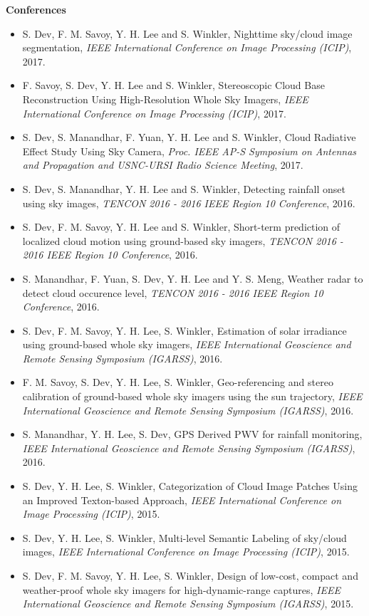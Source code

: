 \noindent 
\textbf{Conferences}
\begin{itemize}[leftmargin=*]
\item S. Dev, F. M. Savoy, Y. H. Lee and S. Winkler, Nighttime sky/cloud image segmentation, \emph{IEEE International Conference on Image Processing (ICIP)}, 2017.
\item F. Savoy, S. Dev, Y. H. Lee and S. Winkler, Stereoscopic Cloud Base Reconstruction Using High-Resolution Whole Sky Imagers, \emph{IEEE International Conference on Image Processing (ICIP)}, 2017. 
\item S. Dev, S. Manandhar, F. Yuan, Y. H. Lee and S. Winkler, Cloud Radiative Effect Study Using Sky Camera, \emph{Proc. IEEE AP-S Symposium on Antennas and Propagation and USNC-URSI Radio Science Meeting}, 2017.
\item  S. Dev, S. Manandhar, Y. H. Lee and S. Winkler,  Detecting rainfall onset using sky images, \emph{TENCON 2016 - 2016 IEEE Region 10 Conference}, 2016.
\item  S. Dev, F. M. Savoy, Y. H. Lee and S. Winkler, Short-term prediction of localized cloud motion using ground-based sky imagers, \emph{TENCON 2016 - 2016 IEEE Region 10 Conference}, 2016.
\item  S. Manandhar, F. Yuan, S. Dev, Y. H. Lee and Y. S. Meng, Weather radar to detect cloud occurence level, \emph{TENCON 2016 - 2016 IEEE Region 10 Conference}, 2016.
\item  S. Dev, F. M. Savoy, Y. H. Lee, S. Winkler, Estimation of solar irradiance using ground-based whole sky imagers, \emph{IEEE International Geoscience and Remote Sensing Symposium (IGARSS)}, 2016.
\item F. M. Savoy, S. Dev, Y. H. Lee, S. Winkler, Geo-referencing and stereo calibration of ground-based whole sky imagers using the sun trajectory, \emph{IEEE International Geoscience and Remote Sensing Symposium (IGARSS)}, 2016.
\item S. Manandhar, Y. H. Lee, S. Dev, GPS Derived PWV for rainfall monitoring, \emph{IEEE International Geoscience and Remote Sensing Symposium (IGARSS)}, 2016.
\item S. Dev, Y. H. Lee, S. Winkler, Categorization of Cloud Image Patches Using an Improved Texton-based Approach, \emph{IEEE International Conference on Image Processing (ICIP)}, 2015. 
\item S. Dev, Y. H. Lee, S. Winkler, Multi-level Semantic Labeling of sky/cloud images, \emph{IEEE International Conference on Image Processing (ICIP)}, 2015. 
\item S. Dev, F. M. Savoy, Y. H. Lee, S. Winkler, Design of low-cost, compact and weather-proof whole sky imagers for high-dynamic-range captures, \emph{IEEE International Geoscience and Remote Sensing Symposium (IGARSS)}, 2015.

\end{itemize}
